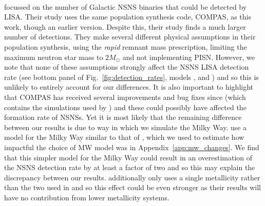 \paragraph{\citet{Lau+2020}} focussed on the number of Galactic NSNS binaries that could be detected by LISA. Their study uses the same population synthesis code, COMPAS, as this work, though an earlier version. Despite this, their study finds a much larger number of detections. They make several different physical assumptions in their population synthesis, using the \citet{Fryer+2012} \textit{rapid} remnant mass prescription, limiting the maximum neutron star mass to $2 \unit{M_{\odot}}$ and not implementing PISN. However, we note that none of these assumptions strongly affect the NSNS LISA detection rate (see bottom panel of Fig.~\ref{fig:detection_rates}, models \modRapid{}, \modNSLow{} and \modNoPISN{}) and so this is unlikely to entirely account for our differences. It is also important to highlight that COMPAS has received several improvements and bug fixes since \citet{Vigna-Gomez+2018} (which contains the simulations used by \citet{Lau+2020}) and these could possibly have affected the formation rate of NSNSs.
%
Yet it is most likely that the remaining difference between our results is due to way in which we simulate the Milky Way. \citet{Lau+2020} use a model for the Milky Way similar to that of \citet{Breivik+2020}, which we used to estimate how impactful the choice of MW model was in Appendix~\ref{app:mw_changes}. We find that this simpler model for the Milky Way could result in an overestimation of the NSNS detection rate by at least a factor of two and so this may explain the discrepancy between our results. \citet{Lau+2020} additionally only uses a single metallicity rather than the two used in \citet{Breivik+2020} and so this effect could be even stronger as their results will have no contribution from lower metallicity systems.

